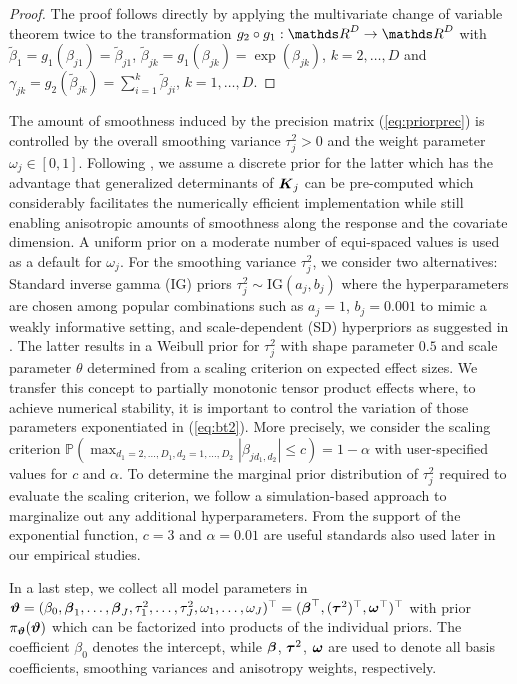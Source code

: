 \documentclass[12pt]{article}
\theoremstyle{plain}
\begin{document}
\begin{proof}
The proof follows directly by applying the multivariate change of variable theorem twice to the transformation $g_2\circ g_1:\dsR^D\to\dsR^D$ with $\tilde\beta_1=g_1(\beta_{j1})=\tilde\beta_{j1}$, $\tilde\beta_{jk}=g_1(\beta_{jk})=\exp(\beta_{jk})$, $k=2,\ldots,D$ and $\gamma_{jk}=g_2(\tilde\beta_{jk})=\sum_{i=1}^k\tilde\beta_{ji}$, $k=1,\ldots,D$.
\end{proof}
The amount of smoothness induced by the precision matrix (\ref{eq:priorprec}) is controlled by the overall smoothing variance $\tau_{j}^2>0$ and the weight parameter $\omega_j\in[0,1]$. Following \citet{kneib2019modular}, we assume a discrete prior for the latter which has the advantage that generalized determinants of $\text{\boldmath$K$}_j$ can be pre-computed which considerably facilitates the numerically efficient implementation while still enabling anisotropic amounts of smoothness along the response and the covariate dimension. A uniform prior on a moderate number of equi-spaced values is used as a default for $\omega_j$. For the smoothing variance $\tau_j^2$, we consider two alternatives: Standard inverse gamma (IG) priors $\tau_{j}^2 \sim \mathrm{IG}(a_{j},b_{j})$ where the hyperparameters are chosen among popular combinations such as $a_{j}=1$, $b_{j}=0.001$ to mimic a weakly informative setting, and scale-dependent (SD) hyperpriors as suggested in \citet{KleKne2016}. The latter results in a Weibull prior for $\tau_j^2$ with shape parameter $0.5$ and scale parameter $\theta$ determined from a scaling criterion on expected effect sizes. We transfer this concept to partially monotonic tensor product effects where, to achieve numerical stability, it is important to control the variation of those parameters exponentiated in (\ref{eq:bt2}).  More precisely, we consider the scaling criterion
$
 \mathbb{P}\left(
 \max_{d_1=2,\ldots,D_1, d_2=1,\ldots,D_2}
 |\beta_{jd_1,d_2}|
 \le c\right) = 1-\alpha
$
with user-specified values for $c$ and $\alpha$. To determine the marginal prior distribution of $\tau_j^2$ required to evaluate the scaling criterion, we follow a simulation-based approach to marginalize out any additional hyperparameters. From the support of the exponential function, $c=3$ and $\alpha=0.01$ are useful standards also used later in our empirical studies.

In a last step, we collect all model parameters in 
$\text{\boldmath$\vartheta$}= (\beta_0,\text{\boldmath$\beta$}_1, \ldots, \text{\boldmath$\beta$}_J, \tau_{1}^2, \ldots,\allowbreak \tau_{J}^2, \omega_1, \ldots,\allowbreak \omega_J)^\top = (\text{\boldmath$\beta$}^\top, (\text{\boldmath$\tau$}^2)^\top, \text{\boldmath$\omega$}^\top)^\top$
with prior $\pi_{\text{\boldmath$\vartheta$}}(\text{\boldmath$\vartheta$})$ which can be factorized into products of the individual priors. The coefficient $\beta_0$ denotes the intercept, while $\text{\boldmath$\beta$}$, $\text{\boldmath$\tau$}^2$, $\text{\boldmath$\omega$}$ are used to denote all basis coefficients, smoothing variances and anisotropy weights, respectively.
\end{document}
